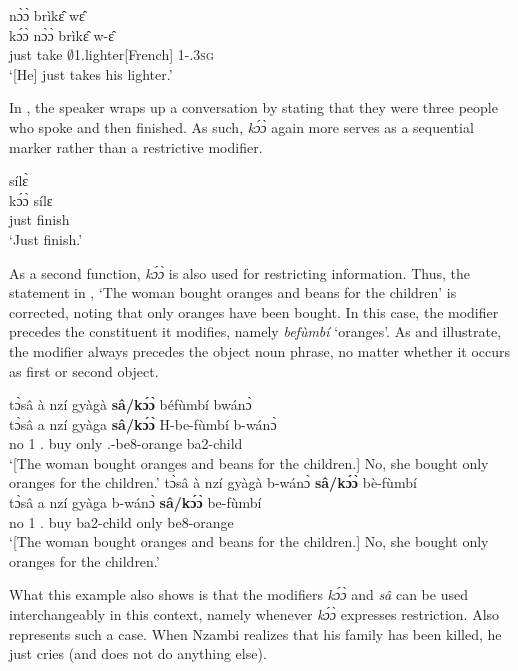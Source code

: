 \ea \label{koo1}
   nɔ̀ɔ̀ brìkɛ̂ wɛ̂ \\
        kɔ́ɔ̀ nɔ̀ɔ̀ brìkɛ̂ w-ɛ̂ \\
      just take $\emptyset$1.lighter[French] 1-{\POSS}.3\textsc{sg} \\
    \trans `[He] just takes his lighter.'
\z

In , the speaker wraps up a conversation by stating that they were three people who spoke and then finished. As such, {\itshape kɔ́ɔ̀} again more serves as a sequential marker rather than a restrictive modifier.

\ea \label{koo2}
   sílɛ̀ \\
        kɔ́ɔ̀ sílɛ \\
       just finish\\
    \trans `Just finish.'
\z

As a second function, {\itshape kɔ́ɔ̀} is also used for restricting information. Thus, the statement in , `The woman bought oranges and beans for the children' is corrected, noting that only oranges have been bought. In this case, the modifier precedes the constituent it modifies, namely {\itshape befùmbí} `oranges'. As  and  illustrate, the modifier always precedes the object noun phrase, no matter whether it occurs as first or second object.

\ea \label{koo3} 
\ea \label{koo3a}
   \glll tɔ̀sâ à nzí gyàgà {\bfseries sâ/kɔ́ɔ̀} béfùmbí bwánɔ̀ \\
          tɔ̀sâ a nzí gyàga {\bfseries sâ/kɔ́ɔ̀} H-be-fùmbí b-wánɔ̀ \\
        no 1 {\PROG}.{\PST} buy only {\OBJ}.{\LINK}-be8-orange ba2-child\\
    \trans `[The woman bought oranges and beans for the children.{\textemdash}] No, she bought only oranges for the children.'
\ex \label{koo3b}
   \glll tɔ̀sâ à nzí gyàgà b-wánɔ̀ {\bfseries sâ/kɔ́ɔ̀} bè-fùmbí \\
     tɔ̀sâ a nzí gyàga b-wánɔ̀ {\bfseries sâ/kɔ́ɔ̀} be-fùmbí \\
        no 1 {\PROG}.{\PST} buy ba2-child only be8-orange\\
    \trans `[The woman bought oranges and beans for the children.{\textemdash}] No, she bought only oranges for the children.'
\z
\z 

\noindent What this example also shows is that the modifiers {\itshape kɔ́ɔ̀} and {\itshape sâ} can be used interchangeably in this context, namely whenever {\itshape kɔ́ɔ̀} expresses restriction. Also  represents such a case. When Nzambi realizes that his family has been killed, he just cries (and does not do anything else).

